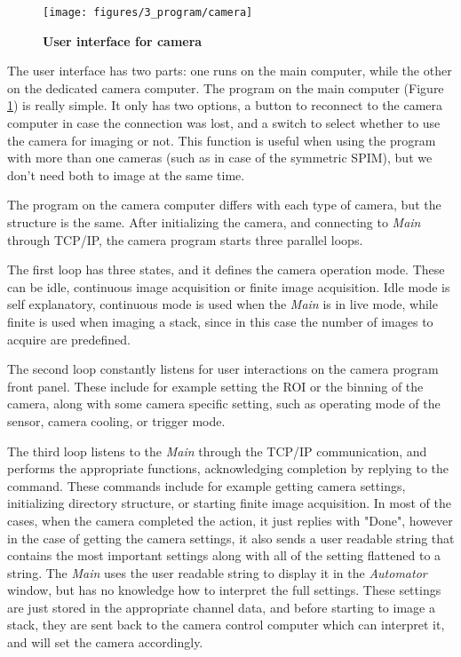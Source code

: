 \documentclass{tdk_style}
\begin{document}
\begin{figure}[htbp]
	\centering
	\texttt{[image: figures/3\_program/camera]}
	\caption{\textbf{User interface for camera}}
	\label{fig:ui_camera}
\end{figure}

The user interface has two parts: one runs on the main computer, while the other on the dedicated camera computer. The program on the main computer (Figure \ref{fig:ui_camera}) is really simple. It only has two options, a button to reconnect to the camera computer in case the connection was lost, and a switch to select whether to use the camera for imaging or not. This function is useful when using the program with more than one cameras (such as in case of the symmetric SPIM), but we don't need both to image at the same time.

The program on the camera computer differs with each type of camera, but the structure is the same. After initializing the camera, and connecting to \emph{Main} through TCP/IP, the camera program starts three parallel loops.

The first loop has three states, and it defines the camera operation mode. These can be idle, continuous image acquisition or finite image acquisition. Idle mode is self explanatory, continuous mode is used when the \emph{Main} is in live mode, while finite is used when imaging a stack, since in this case the number of images to acquire are predefined.

The second loop constantly listens for user interactions on the camera program front panel. These include for example setting the ROI or the binning of the camera, along with some camera specific setting, such as operating mode of the sensor, camera cooling, or trigger mode.

The third loop listens to the \emph{Main} through the TCP/IP communication, and performs the appropriate functions, acknowledging completion by replying to the command. These commands include for example getting camera settings, initializing directory structure, or starting finite image acquisition. In most of the cases, when the camera completed the action, it just replies with "Done", however in the case of getting the camera settings, it also sends a user readable string that contains the most important settings along with all of the setting flattened to a string. The \emph{Main} uses the user readable string to display it in the \emph{Automator} window, but has no knowledge how to interpret the full settings. These settings are just stored in the appropriate channel data, and before starting to image a stack, they are sent back to the camera control computer which can interpret it, and will set the camera accordingly.
\end{document}
